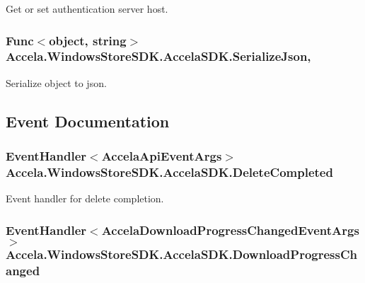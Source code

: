 Get or set authentication server host. 

\hypertarget{class_accela_1_1_windows_store_s_d_k_1_1_accela_s_d_k_aa1e3cffaada3d7a8a17dc9a3fbba48a7}{
\subsubsection[{Serialize\+Json}]{\setlength{\rightskip}{0pt plus 5cm}Func$<$object, string$>$ Accela.\+Windows\+Store\+S\+D\+K.\+Accela\+S\+D\+K.\+Serialize\+Json\hspace{0.3cm}{\ttfamily [get]}, {\ttfamily [set]}}}\label{class_accela_1_1_windows_store_s_d_k_1_1_accela_s_d_k_aa1e3cffaada3d7a8a17dc9a3fbba48a7}


Serialize object to json. 



\subsection{Event Documentation}
\hypertarget{class_accela_1_1_windows_store_s_d_k_1_1_accela_s_d_k_aee12c0ad198a72d8b917f2e953e87157}{
\subsubsection[{Delete\+Completed}]{\setlength{\rightskip}{0pt plus 5cm}Event\+Handler$<${\bf Accela\+Api\+Event\+Args}$>$ Accela.\+Windows\+Store\+S\+D\+K.\+Accela\+S\+D\+K.\+Delete\+Completed}}\label{class_accela_1_1_windows_store_s_d_k_1_1_accela_s_d_k_aee12c0ad198a72d8b917f2e953e87157}


Event handler for delete completion. 

\hypertarget{class_accela_1_1_windows_store_s_d_k_1_1_accela_s_d_k_aa6cf2bc41f9604cb30881e19196fcfdc}{
\subsubsection[{Download\+Progress\+Changed}]{\setlength{\rightskip}{0pt plus 5cm}Event\+Handler$<${\bf Accela\+Download\+Progress\+Changed\+Event\+Args}$>$ Accela.\+Windows\+Store\+S\+D\+K.\+Accela\+S\+D\+K.\+Download\+Progress\+Changed}}\label{class_accela_1_1_windows_store_s_d_k_1_1_accela_s_d_k_aa6cf2bc41f9604cb30881e19196fcfdc}


